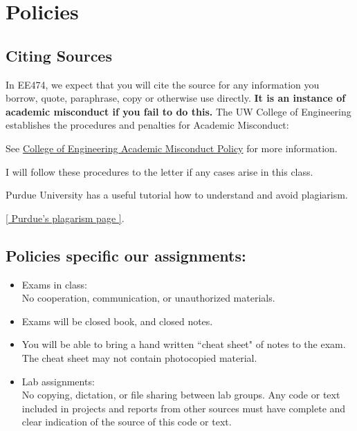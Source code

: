 \documentclass{article}	%
\begin{document}
\section{Policies}

\subsection{Citing Sources}

In EE474, we expect that you will cite the source for
any information you borrow, quote, paraphrase, copy or otherwise use directly.
{\bf It is an instance of academic misconduct if you fail to do this.}
The UW College of Engineering establishes the procedures and penalties for
Academic Misconduct:

See \href{https://www.engr.washington.edu/current/policies/academic-integrity-misconduct}
    {College of Engineering Academic Misconduct Policy}
      for more information.

I will follow these procedures to the letter if any cases arise
in this class.

Purdue University has a useful tutorial how to understand and avoid plagiarism.

\href{https://owl.purdue.edu/owl/avoiding_plagiarism/index.html}{[ Purdue's plagarism page ]}.



\subsection{Policies specific our assignments:}
\begin{itemize}
\item Exams in class:\\
      No cooperation, communication, or unauthorized materials.
\item  Exams will be closed book, and closed notes.
\item  You will be able to bring a hand written ``cheat sheet" of notes
to the exam.  The cheat sheet may not contain photocopied material.
\item Lab assignments:\\
      No copying, dictation, or file sharing between lab groups. Any code or
      text included in projects and reports from other sources must have complete
      and clear indication of the source of this code or text.
\end{itemize}
\end{document}
